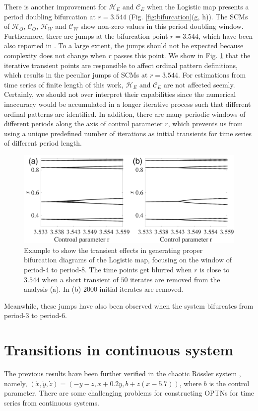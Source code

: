 \documentclass[12pt,aip,cha,reprint,nofootinbib]{revtex4-1}
\begin{document}
There is another improvement for $\mathcal{H}_E$ and $\mathcal{C}_E$ when the Logistic map presents a period doubling bifurcation at $r = 3.544$ (Fig. \ref{fig:bifurcation}(g, h)). The SCMs of $\mathcal{H}_O$,  $\mathcal{C}_O$, $\mathcal{H}_W$ and $\mathcal{C}_W$ show non-zero values in this period doubling window. Furthermore, there are jumps at the bifurcation point $r = 3.544$, which have been also reported in \cite{BandtPRL2002}. To a large extent, the jumps should not be expected because complexity does not change when $r$ passes this point. We show in Fig. \ref{fig:transient} that the iterative transient points are responsible to affect ordinal pattern definitions, which results in the peculiar jumps of SCMs at $r = 3.544$. For estimations from time series of finite length of this work, $\mathcal{H}_E$ and $\mathcal{C}_E$ are not affected seemly. Certainly, we should not over interpret their capabilities since the numerical inaccuracy would be accumulated in a longer iterative process such that different ordinal patterns are identified. In addition, there are many periodic windows of different periods along the axis of control parameter $r$, which prevents us from using a unique predefined number of iterations as initial transients for time series of different period length. 
\begin{figure}
	\centering
	\includegraphics[width=\columnwidth]{period4_exampleTransients.pdf}
\caption{\small{Example to show the transient effects in generating proper bifurcation diagrams of the Logistic map, focusing on the window of period-4 to period-8. The time points get blurred when $r$ is close to $3.544$ when a short transient of $50$ iterates are removed from the analysis (a). In (b) $2000$ initial iterates are removed. }\label{fig:transient}}
\end{figure}
Meanwhile, these jumps have also been observed when the system bifurcates from period-3 to period-6. 

\section{Transitions in continuous system}
The previous results have been further verified in the chaotic R\"ossler system \cite{Roessler1976}, namely, $(\dot{x}, \dot{y}, \dot{z}) = (-y-z, x+0.2y, b+z(x-5.7))$, where $b$ is the control parameter. There are some challenging problems for constructing OPTNs for time series from continuous systems. 
\end{document}

